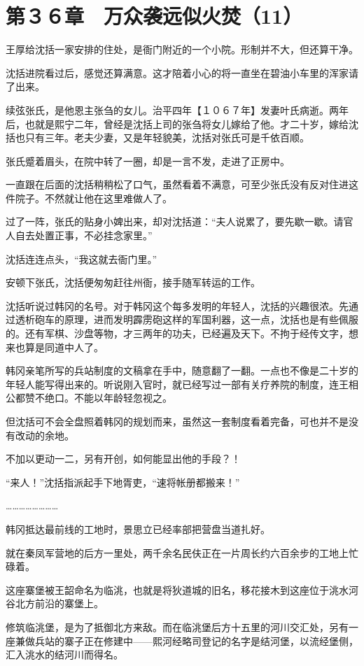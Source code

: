 \section{第３６章　万众袭远似火焚（11）}

王厚给沈括一家安排的住处，是衙门附近的一个小院。形制并不大，但还算干净。

沈括进院看过后，感觉还算满意。这才陪着小心的将一直坐在碧油小车里的浑家请了出来。

续弦张氏，是他恩主张刍的女儿。治平四年【１０６７年】发妻叶氏病逝。两年后，也就是熙宁二年，曾经是沈括上司的张刍将女儿嫁给了他。才二十岁，嫁给沈括也只有三年。老夫少妻，又是年轻貌美，沈括对张氏可是千依百顺。

张氏蹙着眉头，在院中转了一圈，却是一言不发，走进了正房中。

一直跟在后面的沈括稍稍松了口气，虽然看着不满意，可至少张氏没有反对住进这件院子。不然就让他在这里难做人了。

过了一阵，张氏的贴身小婢出来，却对沈括道：“夫人说累了，要先歇一歇。请官人自去处置正事，不必挂念家里。”

沈括连连点头，“我这就去衙门里。”

安顿下张氏，沈括便匆匆赶往州衙，接手随军转运的工作。

沈括听说过韩冈的名号。对于韩冈这个每多发明的年轻人，沈括的兴趣很浓。先通过透析砲车的原理，进而发明霹雳砲这样的军国利器，这一点，沈括也是有些佩服的。还有军棋、沙盘等物，才三两年的功夫，已经遍及天下。不拘于经传文字，想来也算是同道中人了。

韩冈亲笔所写的兵站制度的文稿拿在手中，随意翻了一翻。一点也不像是二十岁的年轻人能写得出来的。听说刚入官时，就已经写过一部有关疗养院的制度，连王相公都赞不绝口。不能以年龄轻忽视之。

但沈括可不会全盘照着韩冈的规划而来，虽然这一套制度看着完备，可也并不是没有改动的余地。

不加以更动一二，另有开创，如何能显出他的手段？！

“来人！”沈括指派起手下地胥吏，“速将帐册都搬来！”

……………………

韩冈抵达最前线的工地时，景思立已经率部把营盘当道扎好。

就在秦凤军营地的后方一里处，两千余名民伕正在一片周长约六百余步的工地上忙碌着。

这座寨堡被王韶命名为临洮，也就是将狄道城的旧名，移花接木到这座位于洮水河谷北方前沿的寨堡上。

修筑临洮堡，是为了抵御北方来敌。而在临洮堡后方十五里的河川交汇处，另有一座兼做兵站的寨子正在修建中——熙河经略司登记的名字是结河堡，以流经堡侧，汇入洮水的结河川而得名。

